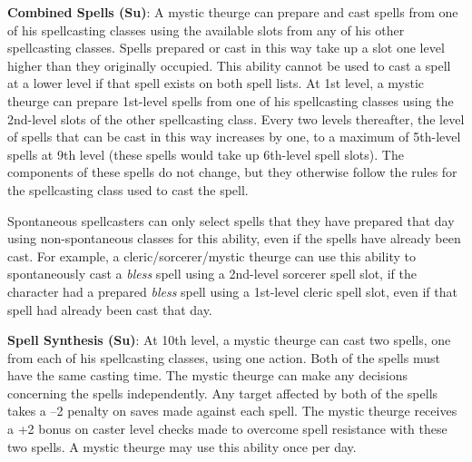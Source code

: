 \textbf{Combined Spells (Su)}: A mystic theurge can prepare and cast spells from one of his spellcasting classes using the available slots from any of his other spellcasting classes. Spells prepared or cast in this way take up a slot one level higher than they originally occupied. This ability cannot be used to cast a spell at a lower level if that spell exists on both spell lists. At 1st level, a mystic theurge can prepare 1st-level spells from one of his spellcasting classes using the 2nd-level slots of the other spellcasting class. Every two levels thereafter, the level of spells that can be cast in this way increases by one, to a maximum of 5th-level spells at 9th level (these spells would take up 6th-level spell slots). The components of these spells do not change, but they otherwise follow the rules for the spellcasting class used to cast the spell. 
				
Spontaneous spellcasters can only select spells that they have prepared that day using non-spontaneous classes for this ability, even if the spells have already been cast. For example, a cleric/sorcerer/mystic theurge can use this ability to spontaneously cast a \textit{bless} spell using a 2nd-level sorcerer spell slot, if the character had a prepared \textit{bless }spell using a 1st-level cleric spell slot, even if that spell had already been cast that day.
				
\textbf{Spell Synthesis (Su)}: At 10th level, a mystic theurge can cast two spells, one from each of his spellcasting classes, using one action. Both of the spells must have the same casting time. The mystic theurge can make any decisions concerning the spells independently. Any target affected by both of the spells takes a --2 penalty on saves made against each spell. The mystic theurge receives a +2 bonus on caster level checks made to overcome spell resistance with these two spells. A mystic theurge may use this ability once per day.
        	
